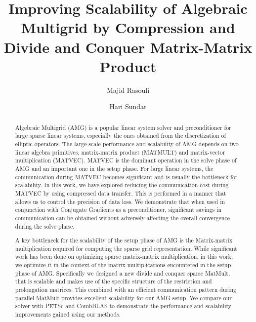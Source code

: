 \documentclass[sigconf]{acmart}
\begin{document}
\title{Improving Scalability of Algebraic Multigrid by Compression and Divide and Conquer Matrix-Matrix Product}

\author{Majid Rasouli}

\author{Hari Sundar}




\begin{abstract}
Algebraic Multigrid (AMG) is a popular linear system solver and preconditioner for large sparse linear systems, especially the ones obtained from the discretization of elliptic operators. The large-scale performance and scalability of AMG depends on two linear algebra primitives, matrix-matrix product (MATMULT) and matrix-vector multiplication (MATVEC). MATVEC is the dominant operation in the solve phase of AMG and an important one in the setup phase. For large linear systems, the communication during MATVEC becomes significant and is usually the bottleneck for scalability. In this work, we have explored  reducing the communication cost during MATVEC by using compressed data transfer. This is performed in a manner that allows us to control the precision of data loss. We demonstrate that when used in conjunction with Conjugate Gradients as a preconditioner, significant savings in communication can be obtained without adversely affecting the overall convergence during the solve phase.

A key bottleneck for the scalability of the setup phase of AMG is the Matrix-matrix multiplication required for computing the sparse grid representation. While significant work has been done on optimizing sparse matrix-matrix multiplication, in this work, we optimize it in the context of the matrix multiplications encountered in the setup phase of AMG. Specifically we designed a new divide and conquer sparse MatMult, that is scalable and makes use of the specific structure of the restriction and prolongation matrices. This combined with an efficient communication pattern during parallel MatMult provides excellent scalability for our AMG setup. We compare our solver with PETSc and CombBLAS to demonstrate the performance and scalability improvements gained using our methods.
\end{abstract}
\end{document}
